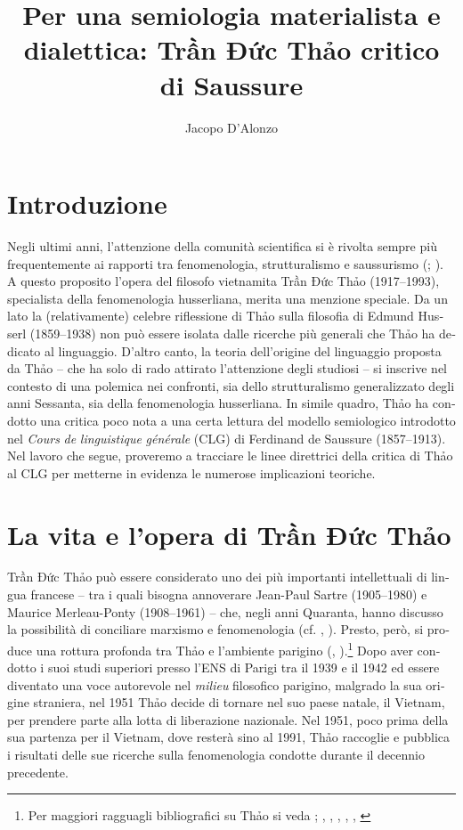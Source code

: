 \documentclass[italian,output=paper,colorlinks,citecolor=brown]{../langscibook}
\author{Jacopo D’Alonzo\affiliation{Sapienza Università di Roma}\orcid{}}
\title{Per una semiologia materialista e dialettica: Trần Đức Thảo critico di Saussure}
\begin{document}
\begin{otherlanguage}{italian}
\maketitle

\section{Introduzione} 

 Negli ultimi anni, l’attenzione della comunità scientifica si è rivolta sempre più frequentemente ai rapporti tra fenomenologia, strutturalismo e saussurismo (\citealt{De-Palo2016Italian}; \citealt{Aurora2017}). A questo proposito l’opera del filosofo vietnamita Trần Đức Thảo (1917--1993), specialista della fenomenologia husserliana, merita una menzione speciale. Da un lato la (relativamente) celebre riflessione di Thảo sulla filosofia di Edmund Husserl (1859--1938) non può essere isolata dalle ricerche più generali che Thảo ha dedicato al linguaggio. D’altro canto, la teoria dell’origine del linguaggio proposta da Thảo – che ha solo di rado attirato l’attenzione degli studiosi – si inscrive nel contesto di una polemica nei confronti, sia dello strutturalismo generalizzato degli anni Sessanta, sia della fenomenologia husserliana. In simile quadro, Thảo ha condotto una critica poco nota a una certa lettura del modello semiologico introdotto nel \textit{Cours} \textit{de} \textit{linguistique} \textit{générale} (CLG) di Ferdinand de Saussure (1857--1913). Nel lavoro che segue, proveremo a tracciare le linee direttrici della critica di Thảo al CLG per metterne in evidenza le numerose implicazioni teoriche.

\section{La vita e l’opera di Trần Đức Thảo} 

Trần Đức Thảo può essere considerato uno dei più importanti intellettuali di lingua francese – tra i quali bisogna annoverare Jean-Paul Sartre (1905--1980) e Maurice Merleau-Ponty (1908--1961) – che, negli anni Quaranta, hanno discusso la possibilità di conciliare marxismo e fenomenologia (cf. \citealt{Thao1946}, \citeyear{Thao1949}). Presto, però, si produce una rottura profonda tra Thảo e l’ambiente parigino (\citealt{Thao1950}, \citeyear{Thao1951}).\footnote{ \textrm{Per maggiori ragguagli bibliografici su Thảo si veda \citealt[1--11]{Thao1991}; \citealt{Thao1993}, \citealt{Giao1988}, \citealt{Hémery2013}, \citealt{Thao2004}, \citeyear{Thao2013}, \citealt{Feron2014}}} Dopo aver condotto i suoi studi superiori presso l’ENS di Parigi tra il 1939 e il 1942 ed essere diventato una voce autorevole nel \textit{milieu} filosofico parigino, malgrado la sua origine straniera, nel 1951 Thảo decide di tornare nel suo paese natale, il Vietnam, per prendere parte alla lotta di liberazione nazionale. Nel 1951, poco prima della sua partenza per il Vietnam, dove resterà sino al 1991, Thảo raccoglie e pubblica i risultati delle sue ricerche sulla fenomenologia condotte durante il decennio precedente. 


\end{otherlanguage}
\end{document}
